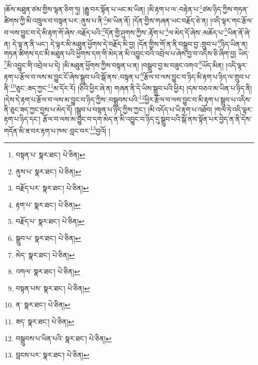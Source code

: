 །ཆོས་མཐུན་ཙམ་གྱིས་ལྷན་ཅིག་ཏུ། །རྒྱུ་བར་སྟོན་པ་ཡང་མ་ཡིན། །མི་རྟག་པ་ལ་:བརྟེན་པ་\footnote{བསྟན་པ་  སྣར་ཐང་།  པེ་ཅིན། }ཙམ་ཉིད་ཀྱིས་གཏན་ཚིགས་ཀྱི་མི་འཁྲུལ་བ་བསྟན་པར་:ནུས་པ་ནི་\footnote{ནུས་པ་  སྣར་ཐང་།  པེ་ཅིན། }མ་ཡིན་ནོ། །དོན་གྱིས་གཞན་ཡང་བརྗོད་ཅེ་ན། །འདི་ལྟར་གང་རྩོལ་བ་ལས་བྱུང་བ་དེ་མི་རྟག་གོ་ཞེས་:བརྗོད་པའི་\footnote{བརྗོད་པར་  སྣར་ཐང་།  པེ་ཅིན། }དོན་གྱི་ཤུགས་ཀྱིས་:རྟོག་པ་\footnote{རྟག་པ་  སྣར་ཐང་།  པེ་ཅིན། }ལ་མེད་དོ་ཞེས་:མཆོད་པ་\footnote{བརྗོད་པ་  སྣར་ཐང་།  པེ་ཅིན། }ཡིན་ནོ་ཞེ་ན། དེ་ལྟ་ན་ནི་ཡང་། དེ་ལྟར་མི་མཐུན་ཕྱོགས་དེ་བརྗོད་མི་བྱ། །དོན་གྱིས་གོ་ན་ནི་བསྒྲུབ་བྱ་:གྲུབ་པ་\footnote{སྒྲུབ་པ་  སྣར་ཐང་།  པེ་ཅིན། }ཉིད་ཡིན་ན། གཏན་ཚིགས་དང་མི་མཐུན་པའི་ཕྱོགས་དག་གི་མེད་ན་མི་འབྱུང་བའི་འབྲེལ་པ་ཞེས་བྱ་བ་འདིས་ཅི་ཞིག་བྱ། ཡིད་\footnote{མེད་  སྣར་ཐང་།  པེ་ཅིན། }མི་འབྱུང་གི་འབྲེལ་པ་དེ། །མི་མཐུན་ཕྱོགས་ཀྱིས་བསྟན་པ་ན། །བསྒྲུབ་བྱ་མ་བཟུང་འགའ་\footnote{འགལ་  སྣར་ཐང་།  པེ་ཅིན། }ཡོད་མིན། །འདི་ལྟར་རྟག་པ་རྩོལ་བ་ལས་མ་བྱུང་ངོ་ཞེས་སྒྲུབ་པའི་སྒོ་ནས་:བསྟན་པ་\footnote{བསྟན་པས་  སྣར་ཐང་།  པེ་ཅིན། }རྩོལ་བ་ལས་བྱུང་བ་ཉིད་མི་རྟག་པ་ཉིད་ལ་གྲུབ་པ་ནི་\footnote{ན་  སྣར་ཐང་།  པེ་ཅིན། }ཅུང་:ཟད་ཀྱང་\footnote{ཟད་  སྣར་ཐང་།  པེ་ཅིན། }མ་དོར་རོ། །ཅིའི་ཕྱིར་ཞེ་ན། གཞན་ནི་དེ་ཡིས་སྒྲུབ་པའི་ཕྱིར། །དམ་བཅའ་མ་ཡིན་པ་ཉིད་ནི། །དེས་དེ་རྟག་པ་རྩོལ་བ་ལས་མ་བྱུང་བ་ཉིད་ཀྱིས་:བསྒྲུབས་པའི་\footnote{བསྒྲུབས་པ་ཡིན་པའི་  སྣར་ཐང་།  པེ་ཅིན། }ཕྱིར་རྩོལ་བ་ལས་བྱུང་བ་མི་རྟག་པ་སྒྲུབ་པ་འདིས་ནི་ཅུང་ཟད་ཀྱང་བྱས་པ་མེད་དོ། །སྒྲུབ་པ་བསྟན་པ་ཉིད་ཀྱིས་ཀྱང་། །མི་འདོད་པ་ཡི་རྟག་པ་འཐོབ། །གལ་ཏེ་འདི་ལྟར་རྟག་པ་ཉིད་དང་། རྩོལ་བ་ལས་མ་བྱུང་བ་དག་མེད་ན་མི་འབྱུང་བ་ཉིད་དུ་སྒྲུབ་པའི་སྒོ་ནས་སྟོན་པར་བྱེད་ན་ནི་དེས་གདོན་མི་ཟ་བར་རྟག་པ་ཁས་:བླང་བར་\footnote{བླངས་པར་  སྣར་ཐང་།  པེ་ཅིན། }བྱའོ། །
